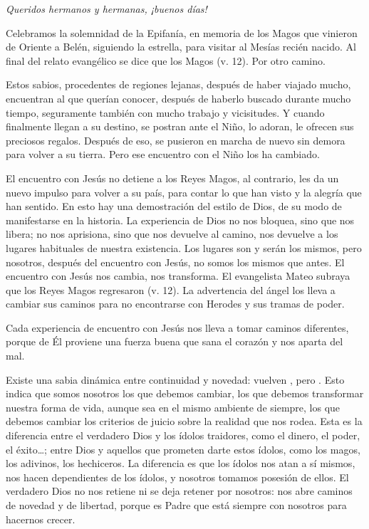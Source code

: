				\begin{body}
									
					\emph{Queridos hermanos y hermanas, ¡buenos días!}
					
					Celebramos la solemnidad de la Epifanía, en memoria de los Magos que vinieron de Oriente a Belén, siguiendo la estrella, para visitar al Mesías recién nacido. Al final del relato evangélico se dice que los Magos  (v. 12). Por otro camino.
					
					Estos sabios, procedentes de regiones lejanas, después de haber viajado mucho, encuentran al que querían conocer, después de haberlo buscado durante mucho tiempo, seguramente también con mucho trabajo y vicisitudes. Y cuando finalmente llegan a su destino, se postran ante el Niño, lo adoran, le ofrecen sus preciosos regalos. Después de eso, se pusieron en marcha de nuevo sin demora para volver a su tierra. Pero ese encuentro con el Niño los ha cambiado.
					
					El encuentro con Jesús no detiene a los Reyes Magos, al contrario, les da un nuevo impulso para volver a su país, para contar lo que han visto y la alegría que han sentido. En esto hay una demostración del estilo de Dios, de su modo de manifestarse en la historia. La experiencia de Dios no nos bloquea, sino que nos libera; no nos aprisiona, sino que nos devuelve al camino, nos devuelve a los lugares habituales de nuestra existencia. Los lugares son y serán los mismos, pero nosotros, después del encuentro con Jesús, no somos los mismos que antes. El encuentro con Jesús nos cambia, nos transforma. El evangelista Mateo subraya que los Reyes Magos regresaron  (v. 12). La advertencia del ángel los lleva a cambiar sus caminos para no encontrarse con Herodes y sus tramas de poder.
					
					Cada experiencia de encuentro con Jesús nos lleva a tomar caminos diferentes, porque de Él proviene una fuerza buena que sana el corazón y nos aparta del mal.
					
					Existe una sabia dinámica entre continuidad y novedad: vuelven , pero . Esto indica que somos nosotros los que debemos cambiar, los que debemos transformar nuestra forma de vida, aunque sea en el mismo ambiente de siempre, los que debemos cambiar los criterios de juicio sobre la realidad que nos rodea. Esta es la diferencia entre el verdadero Dios y los ídolos traidores, como el dinero, el poder, el éxito\ldots{}; entre Dios y aquellos que prometen darte estos ídolos, como los magos, los adivinos, los hechiceros. La diferencia es que los ídolos nos atan a sí mismos, nos hacen dependientes de los ídolos, y nosotros tomamos posesión de ellos. El verdadero Dios no nos retiene ni se deja retener por nosotros: nos abre caminos de novedad y de libertad, porque es Padre que está siempre con nosotros para hacernos crecer.
					

\end{body}
